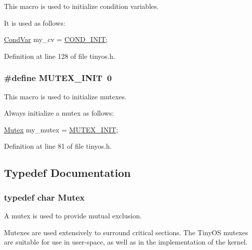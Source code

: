 This macro is used to initialize condition variables. 

It is used as follows\-: 
\begin{DoxyCode}
\hyperlink{structCondVar}{CondVar} my\_cv = \hyperlink{group__syscalls_ga6a7055a466bff255172e05f6ec82d792}{COND\_INIT};
\end{DoxyCode}
 

Definition at line 128 of file tinyos.\-h.

\hypertarget{group__syscalls_ga96be0bfc33e7e113099c7546798bec99}{
\subsubsection[{M\-U\-T\-E\-X\-\_\-\-I\-N\-I\-T}]{\setlength{\rightskip}{0pt plus 5cm}\#define M\-U\-T\-E\-X\-\_\-\-I\-N\-I\-T~0}}\label{group__syscalls_ga96be0bfc33e7e113099c7546798bec99}


This macro is used to initialize mutexes. 

Always initialize a mutex as follows\-: 
\begin{DoxyCode}
\hyperlink{group__syscalls_gaef2ec62cae8e0031fd19fc8b91083ade}{Mutex} my\_mutex = \hyperlink{group__syscalls_ga96be0bfc33e7e113099c7546798bec99}{MUTEX\_INIT};
\end{DoxyCode}
 

Definition at line 81 of file tinyos.\-h.



\subsection{Typedef Documentation}
\hypertarget{group__syscalls_gaef2ec62cae8e0031fd19fc8b91083ade}{
\subsubsection[{Mutex}]{\setlength{\rightskip}{0pt plus 5cm}typedef char {\bf Mutex}}}\label{group__syscalls_gaef2ec62cae8e0031fd19fc8b91083ade}


A mutex is used to provide mutual exclusion. 

Mutexes are used extensively to surround critical sections. The Tiny\-O\-S mutexes are suitable for use in user-\/space, as well as in the implementation of the kernel.

